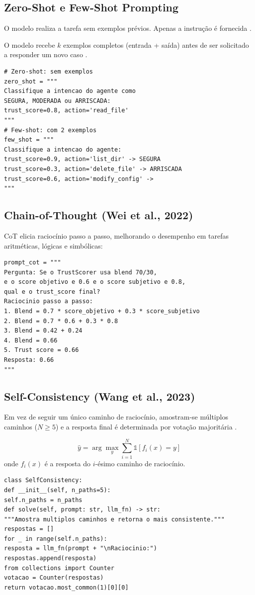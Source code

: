 \subsection{Zero-Shot e Few-Shot Prompting}
\begin{definicao}
O modelo realiza a tarefa sem exemplos prévios. Apenas a instrução é
fornecida \cite{brown2020language}.
\end{definicao}
\begin{definicao}
O modelo recebe $k$ exemplos completos (entrada + saída) antes de ser
solicitado a responder um novo caso \cite{brown2020language}.
\end{definicao}
\begin{lstlisting}[style=pythonstyle]
# Zero-shot: sem exemplos
zero_shot = """
Classifique a intencao do agente como
SEGURA, MODERADA ou ARRISCADA:
trust_score=0.8, action='read_file'
"""
# Few-shot: com 2 exemplos
few_shot = """
Classifique a intencao do agente:
trust_score=0.9, action='list_dir' -> SEGURA
trust_score=0.3, action='delete_file' -> ARRISCADA
trust_score=0.6, action='modify_config' ->
"""
\end{lstlisting}
\subsection{Chain-of-Thought (Wei et al., 2022)}
CoT \cite{wei2022chain} elicia raciocínio passo a passo, melhorando o
desempenho em tarefas aritméticas, lógicas e simbólicas:
\begin{lstlisting}[style=pythonstyle]
prompt_cot = """
Pergunta: Se o TrustScorer usa blend 70/30,
e o score objetivo e 0.6 e o score subjetivo e 0.8,
qual e o trust_score final?
Raciocinio passo a passo:
1. Blend = 0.7 * score_objetivo + 0.3 * score_subjetivo
2. Blend = 0.7 * 0.6 + 0.3 * 0.8
3. Blend = 0.42 + 0.24
4. Blend = 0.66
5. Trust score = 0.66
Resposta: 0.66
"""
\end{lstlisting}
\subsection{Self-Consistency (Wang et al., 2023)}
\begin{definicao}
Em vez de seguir um único caminho de raciocínio, amostram-se múltiplos
caminhos ($N \geq 5$) e a resposta final é determinada por votação
majoritária \cite{wang2023selfconsistency}.
\end{definicao}
\[\hat{y} = \arg\max_y \sum_{i=1}^N \mathds{1}[f_i(x) = y]
\]
onde $f_i(x)$ é a resposta do $i$-ésimo caminho de raciocínio.
\begin{lstlisting}[style=pythonstyle]
class SelfConsistency:
def __init__(self, n_paths=5):
self.n_paths = n_paths
def solve(self, prompt: str, llm_fn) -> str:
"""Amostra multiplos caminhos e retorna o mais consistente."""
respostas = []
for _ in range(self.n_paths):
resposta = llm_fn(prompt + "\nRaciocinio:")
respostas.append(resposta)
from collections import Counter
votacao = Counter(respostas)
return votacao.most_common(1)[0][0]
\end{lstlisting}
